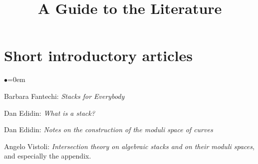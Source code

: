 

%


\title{A Guide to the Literature}

\maketitle

\label{section-phantom}

\tableofcontents

\section{Short introductory articles}
\label{section-short-introductions}


\begin{list}{$\bullet$}{\leftmargin=0em}
\item Barbara Fantechi: \emph{Stacks for Everybody} \cite{fantechi_stacks}
\smallskip
\item Dan Edidin: \emph{What is a stack?} \cite{edidin_whatis}
\smallskip
\item Dan Edidin: \emph{Notes on the construction of the moduli space of
curves} \cite{edidin_notes}
\smallskip
\item Angelo Vistoli: \emph{Intersection theory on algebraic
stacks and on their moduli spaces}, and especially the appendix.
\cite{vistoli_intersection}
\end{list}


